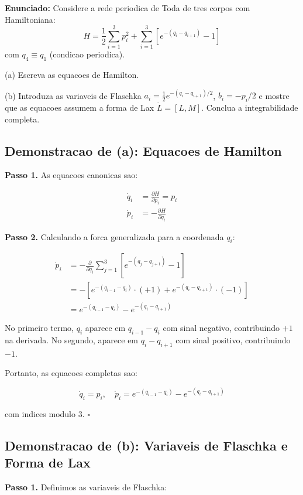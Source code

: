 \documentclass[12pt,a4paper,oneside]{article}
\begin{document}
\textbf{Enunciado:} Considere a rede periodica de Toda de tres corpos com
Hamiltoniana:
$$H = \frac12\sum_{i=1}^3 p_i^2 + \sum_{i=1}^3\left[e^{-(q_i-q_{i+1})} - 1\right]$$
com $q_4 \equiv q_1$ (condicao periodica).

(a) Escreva as equacoes de Hamilton.

(b) Introduza as variaveis de Flaschka $a_i = \frac12 e^{-(q_i-q_{i+1})/2}$,
$b_i = -p_i/2$ e mostre que as equacoes assumem a forma de Lax
$\dot L = [L,M]$. Conclua a integrabilidade completa.

\subsection*{Demonstracao de (a): Equacoes de Hamilton}

\textbf{Passo 1.} As equacoes canonicas sao:

\begin{align*}
\dot q_i &= \frac{\partial H}{\partial p_i} = p_i \\
\dot p_i &= -\frac{\partial H}{\partial q_i}
\end{align*}

\textbf{Passo 2.} Calculando a forca generalizada para a coordenada $q_i$:

\begin{align*}
\dot p_i &= -\frac{\partial}{\partial q_i}\sum_{j=1}^3
\left[e^{-(q_j-q_{j+1})} - 1\right] \\
&= -\left[e^{-(q_{i-1}-q_i)}\cdot(+1) + e^{-(q_i-q_{i+1})}\cdot(-1)\right] \\
&= e^{-(q_{i-1}-q_i)} - e^{-(q_i-q_{i+1})}
\end{align*}

No primeiro termo, $q_i$ aparece em $q_{i-1}-q_i$ com sinal negativo,
contribuindo $+1$ na derivada. No segundo, aparece em $q_i-q_{i+1}$ com
sinal positivo, contribuindo $-1$.

Portanto, as equacoes completas sao:

$$\boxed{\dot q_i = p_i, \quad \dot p_i = e^{-(q_{i-1}-q_i)} -
e^{-(q_i-q_{i+1})}}$$

com indices modulo 3. $\square$

\subsection*{Demonstracao de (b): Variaveis de Flaschka e Forma de Lax}

\textbf{Passo 1.} Definimos as variaveis de Flaschka:
\end{document}
